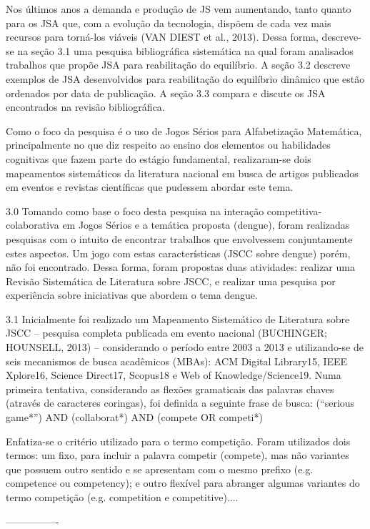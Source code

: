 Nos últimos anos a demanda e produção de JS vem aumentando, tanto quanto para os JSA que, com a evolução da tecnologia, dispõem de cada vez mais recursos para torná-los viáveis (VAN DIEST et al., 2013). Dessa forma, descreve-se na seção 3.1 uma pesquisa bibliográfica sistemática na qual foram analisados trabalhos que propõe JSA para reabilitação do equilíbrio. A seção 3.2 descreve exemplos de JSA desenvolvidos para reabilitação do equilíbrio dinâmico que estão ordenados por data de publicação. A seção 3.3 compara e discute os JSA encontrados na revisão bibliográfica.


Como o foco da pesquisa é o uso de Jogos Sérios para Alfabetização Matemática, principalmente no que diz respeito ao ensino dos elementos ou habilidades cognitivas que fazem parte do estágio fundamental, realizaram-se dois mapeamentos sistemáticos da literatura nacional em busca de artigos publicados em eventos e revistas científicas que pudessem abordar este tema.

3.0 Tomando como base o foco desta pesquisa na interação competitiva-colaborativa em Jogos Sérios e a temática proposta (dengue), foram realizadas pesquisas com o intuito de encontrar trabalhos que envolvessem conjuntamente estes aspectos. Um jogo com estas características (JSCC sobre dengue) porém, não foi encontrado. Dessa forma, foram propostas duas atividades: realizar uma Revisão Sistemática de Literatura sobre JSCC, e realizar uma pesquisa por experiência sobre iniciativas que abordem o tema dengue. 

3.1
Inicialmente foi realizado um Mapeamento Sistemático de Literatura sobre JSCC – pesquisa completa publicada em evento nacional (BUCHINGER; HOUNSELL, 2013) – considerando o período entre 2003 a 2013 e utilizando-se de seis mecanismos de busca acadêmicos (MBAs): ACM Digital Library15, IEEE Xplore16, Science Direct17, Scopus18 e Web of Knowledge/Science19. Numa primeira tentativa, considerando as flexões gramaticais das palavras chaves (através de caracteres coringas), foi definida a seguinte frase de busca: (“serious game*”) AND (collaborat*) AND (compete OR competi*)

Enfatiza-se o critério utilizado para o termo competição. Foram utilizados dois termos: um fixo, para incluir a palavra competir (compete), mas não variantes que possuem outro sentido e se apresentam com o mesmo prefixo (e.g. competence ou competency); e outro flexível para abranger algumas variantes do termo competição (e.g. competition e competitive)....


----------------



